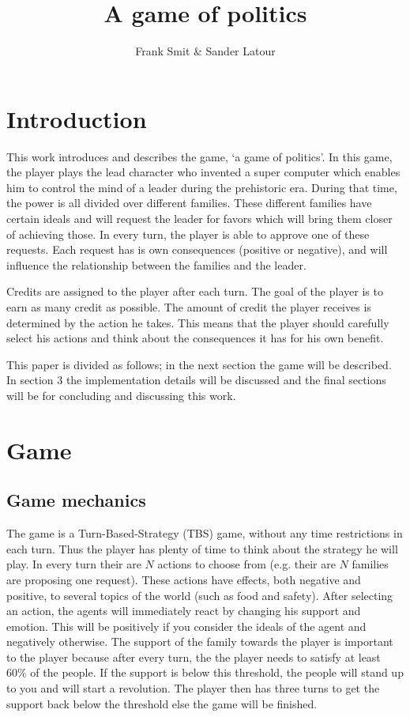 \documentclass[11pt,a4paper]{article}
\author{Frank Smit \& Sander Latour}
\title{A game of politics}
\begin{document}
\maketitle

\section{Introduction}
This work introduces and describes the game, `a game of politics'. In this game, the player plays the lead character who invented a super computer which enables him to control the mind of a leader during the prehistoric era. During that time, the power is all divided over different families. These different families have certain ideals and will request the leader for favors which will bring them closer of achieving those. In every turn, the player is able to approve one of these requests. Each request has is own consequences (positive or negative), and will influence the relationship between the families and the leader. 

Credits are assigned to the player after each turn. The goal of the player is to earn as many credit as possible. The amount of credit the player receives is determined by the action he takes. This means that the player should carefully select his actions and think about the consequences it has for his own benefit. 

This paper is divided as follows; in the next section the game will be described. In section 3 the implementation details will be discussed and the final sections will be for concluding and discussing this work.

\section{Game}
\subsection{Game mechanics}
The game is a Turn-Based-Strategy (TBS) game, without any time restrictions in each turn. Thus the player has plenty of time to think about the strategy he will play. In every turn their are $N$ actions to choose from (e.g. their are $N$ families are proposing one request). These actions have effects, both negative and positive, to several topics of the world (such as food and safety).  After selecting an action, the agents will immediately react by changing his support and emotion. This will be positively if you consider the ideals of the agent and negatively otherwise. The support of the family towards the player is important to the player because after every turn, the the player needs to satisfy at least 60\% of the people. If the support is below this threshold, the people will stand up to you and will start a revolution. The player then has three turns to get the support back below the threshold else the game will be finished. 
\end{document}
